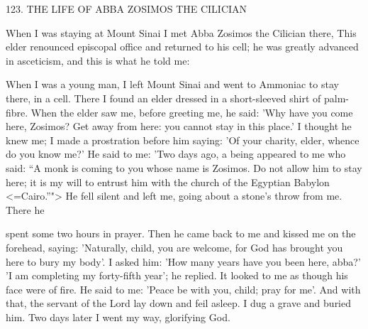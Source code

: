 123. THE LIFE OF ABBA ZOSIMOS THE CILICIAN

When I was staying at Mount Sinai I met Abba Zosimos the
Cilician there, This elder renounced episcopal office and returned to
his cell; he was greatly advanced in asceticism, and this is what he
told me:

When I was a young man, I left Mount Sinai and went to
Ammoniac to stay there, in a cell. There I found an elder dressed in
a short-sleeved shirt of palm-fibre. When the elder saw me, before
greeting me, he said: 'Why have you come here, Zosimos? Get away
from here: you cannot stay in this place.' I thought he knew me; I
made a prostration before him saying: 'Of your charity, elder,
whence do you know me?' He said to me: 'Two days ago, a being
appeared to me who said: “A monk is coming to you whose name
is Zosimos. Do not allow him to stay here; it is my will to entrust
him with the church of the Egyptian Babylon <=Cairo.”"> He fell
silent and left me, going about a stone's throw from me. There he

spent some two hours in prayer. Then he came back to me and
kissed me on the forehead, saying: 'Naturally, child, you are
welcome, for God has brought you here to bury my body'. I asked
him: 'How many years have you been here, abba?' 'I am completing
my forty-fifth year'; he replied. It looked to me as though his face
were of fire. He said to me: 'Peace be with you, child; pray for me'.
And with that, the servant of the Lord lay down and feil asleep. I
dug a grave and buried him. Two days later I went my way,
glorifying God.

